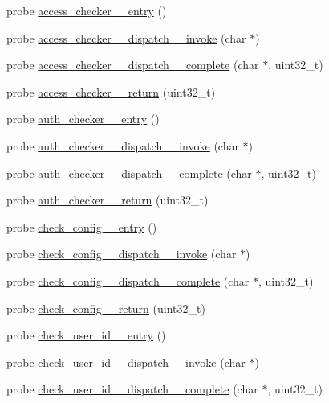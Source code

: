 \begin{DoxyCompactItemize}
probe \hyperlink{apache__probes_8d_a4263c902f40b5c9f5a9a811e272ced9c}{access\+\_\+checker\+\_\+\+\_\+entry} ()
\item 
probe \hyperlink{apache__probes_8d_aece5a05d14c827b65add9ad29514ffc0}{access\+\_\+checker\+\_\+\+\_\+dispatch\+\_\+\+\_\+invoke} (char $\ast$)
\item 
probe \hyperlink{apache__probes_8d_a5f4a21cf778342eb33eb08a21d15a815}{access\+\_\+checker\+\_\+\+\_\+dispatch\+\_\+\+\_\+complete} (char $\ast$, uint32\+\_\+t)
\item 
probe \hyperlink{apache__probes_8d_ae814f24f2e0f1d41a63356481a7bfdaa}{access\+\_\+checker\+\_\+\+\_\+return} (uint32\+\_\+t)
\item 
probe \hyperlink{apache__probes_8d_a6979a29a4ad5c6818c8f1c8dd00eda53}{auth\+\_\+checker\+\_\+\+\_\+entry} ()
\item 
probe \hyperlink{apache__probes_8d_a35dcf3a56a6d1f5aabd30eb1c5d0ee9d}{auth\+\_\+checker\+\_\+\+\_\+dispatch\+\_\+\+\_\+invoke} (char $\ast$)
\item 
probe \hyperlink{apache__probes_8d_abe3a268f2ae8290ac51ad30e50d52d27}{auth\+\_\+checker\+\_\+\+\_\+dispatch\+\_\+\+\_\+complete} (char $\ast$, uint32\+\_\+t)
\item 
probe \hyperlink{apache__probes_8d_a24394294e6a57716160be4d2c82eb7c1}{auth\+\_\+checker\+\_\+\+\_\+return} (uint32\+\_\+t)
\item 
probe \hyperlink{apache__probes_8d_a47dd60b447766b082709af14ba66c437}{check\+\_\+config\+\_\+\+\_\+entry} ()
\item 
probe \hyperlink{apache__probes_8d_a2f60488f347694caffef4d68bb45e11c}{check\+\_\+config\+\_\+\+\_\+dispatch\+\_\+\+\_\+invoke} (char $\ast$)
\item 
probe \hyperlink{apache__probes_8d_aabc8034649d28472e90f294a5e9d1361}{check\+\_\+config\+\_\+\+\_\+dispatch\+\_\+\+\_\+complete} (char $\ast$, uint32\+\_\+t)
\item 
probe \hyperlink{apache__probes_8d_abd44e9cc2d82ee97d0b667da482988dd}{check\+\_\+config\+\_\+\+\_\+return} (uint32\+\_\+t)
\item 
probe \hyperlink{apache__probes_8d_a197b1645e1031c903f39f273b3a63c3a}{check\+\_\+user\+\_\+id\+\_\+\+\_\+entry} ()
\item 
probe \hyperlink{apache__probes_8d_a72fe1d7298144f50232ff0bdc1b4d2e0}{check\+\_\+user\+\_\+id\+\_\+\+\_\+dispatch\+\_\+\+\_\+invoke} (char $\ast$)
\item 
probe \hyperlink{apache__probes_8d_abddf35b9e09f5e7ff850af2a410bb2b6}{check\+\_\+user\+\_\+id\+\_\+\+\_\+dispatch\+\_\+\+\_\+complete} (char $\ast$, uint32\+\_\+t)

\end{DoxyCompactItemize}
